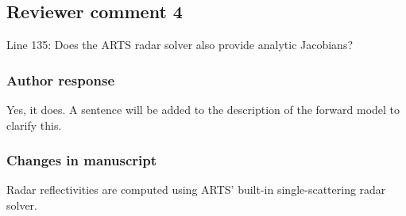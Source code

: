 %

\subsection*{Reviewer comment 4}
Line 135: Does the ARTS radar solver also provide analytic Jacobians?

\subsubsection*{Author response}

Yes, it does. A sentence will be added to the description of the forward model
to clarify this.

\subsubsection*{Changes in manuscript}
\begin{change}[135]
Radar reflectivities are computed using ARTS' built-in single-scattering radar
solver\DIFaddbegin {}\DIFaddend .
\end{change}

